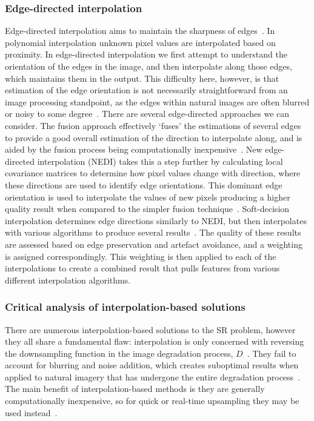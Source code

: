 \subsubsection{Edge-directed interpolation}
Edge-directed interpolation aims to maintain the sharpness of edges~\cite{interpolation}. In polynomial interpolation unknown pixel values are interpolated based on proximity. In edge-directed interpolation we first attempt to understand the orientation of the edges in the image, and then interpolate along those edges, which maintains them in the output. This difficulty here, however, is that estimation of the edge orientation is not necessarily straightforward from an image processing standpoint, as the edges within natural images are often blurred or noisy to some degree~\cite{interpolation}. There are several edge-directed approaches we can consider. The fusion approach effectively `fuses' the estimations of several edges to provide a good overall estimation of the direction to interpolate along, and is aided by the fusion process being computationally inexpensive~\cite{interpolation}. New edge-directed interpolation (NEDI) takes this a step further by calculating local covariance matrices to determine how pixel values change with direction, where these directions are used to identify edge orientations. This dominant edge orientation is used to interpolate the values of new pixels producing a higher quality result when compared to the simpler fusion technique~\cite{interpolation}. Soft-decision interpolation determines edge directions similarly to NEDI, but then interpolates with various algorithms to produce several results~\cite{interpolation}. The quality of these results are assessed based on edge preservation and artefact avoidance, and a weighting is assigned correspondingly. This weighting is then applied to each of the interpolations to create a combined result that pulls features from various different interpolation algorithms.

\subsubsection{Critical analysis of interpolation-based solutions}
There are numerous interpolation-based solutions to the SR problem, however they all share a fundamental flaw: interpolation is only concerned with reversing the downsampling function in the image degradation process, $D$~\cite{interpolation}. They fail to account for blurring and noise addition, which creates suboptimal results when applied to natural imagery that has undergone the entire degradation process~\cite{interpolation}. The main benefit of interpolation-based methods is they are generally computationally inexpensive, so for quick or real-time upsampling they may be used instead~\cite{interpolation}.

